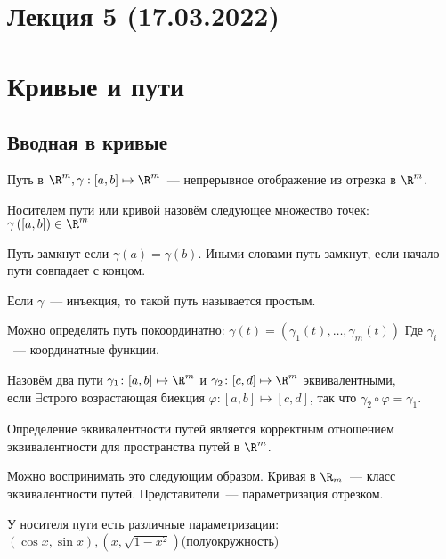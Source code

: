 \section*{Лекция 5 (17.03.2022)}
\section{Кривые и пути}
\subsection{Вводная в кривые}
\begin{definition}
    Путь в $\R^m, \gamma : [a, b] \mapsto \R^m$~--- непрерывное отображение из отрезка в $\R^m$.
\end{definition}
\begin{definition}
    Носителем пути или кривой назовём следующее множество точек: $\gamma\left([a, b]\right)\in \R^m$
\end{definition}
\begin{definition}
    Путь замкнут если $\gamma(a) = \gamma(b)$. Иными словами путь замкнут, если начало пути совпадает с концом.
\end{definition}
\begin{definition}
    Если $\gamma$~--- инъекция, то такой путь называется
    простым.
\end{definition}
\begin{remark}
    Можно определять путь покоординатно:
    $\gamma(t) = (\gamma_1(t),\dots, \gamma_m(t))$ 
    Где $\gamma_i$~--- координатные функции.
\end{remark}
\begin{definition}
    Назовём два пути $\gamma_1\colon [a,b]\mapsto \R^m$ и
    $\gamma_2\colon [c,d]\mapsto \R^m$ эквивалентными,\\
    если $\exists \text{строго возрастающая биекция }
    \varphi\colon [a,b]\mapsto[c, d]$, так что 
    $\gamma_2\circ \varphi = \gamma_1$.
\end{definition}
\begin{remark}
    Определение эквивалентности путей является корректным отношением эквивалентности для пространства путей в $\R^m$.

    Можно воспринимать это следующим образом.
    Кривая в $\R_m$~--- класс эквивалентности путей. Представители~--- параметризация отрезком.
\end{remark}
\begin{example}
    У носителя пути есть различные параметризации:
    $(\cos x, \sin x), (x, \sqrt{1 - x^2})$(полуокружность)
\end{example}
